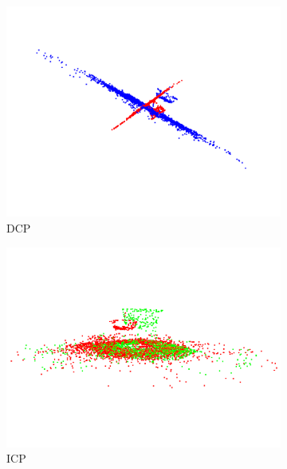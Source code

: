 \documentclass[12pt,titlepage, twoside]{article}
\begin{document}
\begin{figure}[htb]
    \centering 
\begin{subfigure}{0.19\textwidth}
  \includegraphics[width=\linewidth]{./Images/registration_dcp_avocado.png}
  \caption{DCP}
  \label{fig:registration:compare:1}
\end{subfigure}\hfil
\begin{subfigure}{0.19\textwidth}
  \includegraphics[width=\linewidth]{./Images/registration_icp_avocado.png}
  \caption{ICP}
  \label{fig:registration:compare:2}
\end{subfigure}\hfil
\begin{subfigure}{0.19\textwidth}

\end{subfigure}
\end{figure}
\end{document}
